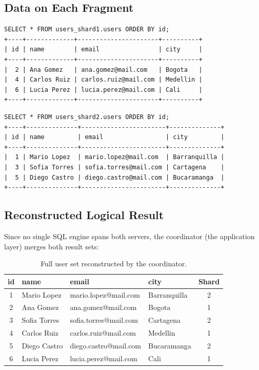 \documentclass[12pt,a4paper]{article}
\begin{document}
\subsection{Data on Each Fragment}

\begin{lstlisting}[style=bashstyle, caption={Shard 1 -- even IDs (mysql-primary).}]
SELECT * FROM users_shard1.users ORDER BY id;
+----+-------------+----------------------+----------+
| id | name        | email                | city     |
+----+-------------+----------------------+----------+
|  2 | Ana Gomez   | ana.gomez@mail.com   | Bogota   |
|  4 | Carlos Ruiz | carlos.ruiz@mail.com | Medellin |
|  6 | Lucia Perez | lucia.perez@mail.com | Cali     |
+----+-------------+----------------------+----------+
\end{lstlisting}

\begin{lstlisting}[style=bashstyle, caption={Shard 2 -- odd IDs (mysql-shard2).}]
SELECT * FROM users_shard2.users ORDER BY id;
+----+--------------+-----------------------+--------------+
| id | name         | email                 | city         |
+----+--------------+-----------------------+--------------+
|  1 | Mario Lopez  | mario.lopez@mail.com  | Barranquilla |
|  3 | Sofia Torres | sofia.torres@mail.com | Cartagena    |
|  5 | Diego Castro | diego.castro@mail.com | Bucaramanga  |
+----+--------------+-----------------------+--------------+
\end{lstlisting}

\subsection{Reconstructed Logical Result}

Since no single SQL engine spans both servers, the coordinator (the
application layer) merges both result sets:

\begin{table}[H]
\centering
\begin{tabularx}{\textwidth}{c l l l c}
\toprule
\textbf{id} & \textbf{name} & \textbf{email} & \textbf{city} & \textbf{Shard} \\
\midrule
1 & Mario Lopez  & mario.lopez@mail.com  & Barranquilla & 2 \\
2 & Ana Gomez    & ana.gomez@mail.com    & Bogota       & 1 \\
3 & Sofia Torres & sofia.torres@mail.com & Cartagena    & 2 \\
4 & Carlos Ruiz  & carlos.ruiz@mail.com  & Medellin     & 1 \\
5 & Diego Castro & diego.castro@mail.com & Bucaramanga  & 2 \\
6 & Lucia Perez  & lucia.perez@mail.com  & Cali         & 1 \\
\bottomrule
\end{tabularx}
\caption{Full user set reconstructed by the coordinator.}
\end{table}
\end{document}
